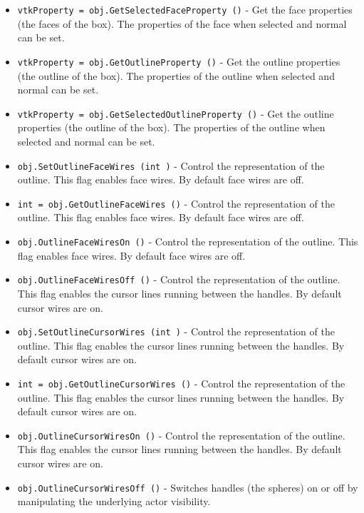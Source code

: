 \begin{itemize}
\item  \verb|vtkProperty = obj.GetSelectedFaceProperty ()| -  Get the face properties (the faces of the box). The 
 properties of the face when selected and normal can be 
 set.

\item  \verb|vtkProperty = obj.GetOutlineProperty ()| -  Get the outline properties (the outline of the box). The 
 properties of the outline when selected and normal can be 
 set.

\item  \verb|vtkProperty = obj.GetSelectedOutlineProperty ()| -  Get the outline properties (the outline of the box). The 
 properties of the outline when selected and normal can be 
 set.

\item  \verb|obj.SetOutlineFaceWires (int )| -  Control the representation of the outline. This flag enables
 face wires. By default face wires are off.

\item  \verb|int = obj.GetOutlineFaceWires ()| -  Control the representation of the outline. This flag enables
 face wires. By default face wires are off.

\item  \verb|obj.OutlineFaceWiresOn ()| -  Control the representation of the outline. This flag enables
 face wires. By default face wires are off.

\item  \verb|obj.OutlineFaceWiresOff ()| -  Control the representation of the outline. This flag enables
 the cursor lines running between the handles. By default cursor
 wires are on.

\item  \verb|obj.SetOutlineCursorWires (int )| -  Control the representation of the outline. This flag enables
 the cursor lines running between the handles. By default cursor
 wires are on.

\item  \verb|int = obj.GetOutlineCursorWires ()| -  Control the representation of the outline. This flag enables
 the cursor lines running between the handles. By default cursor
 wires are on.

\item  \verb|obj.OutlineCursorWiresOn ()| -  Control the representation of the outline. This flag enables
 the cursor lines running between the handles. By default cursor
 wires are on.

\item  \verb|obj.OutlineCursorWiresOff ()| -  Switches handles (the spheres) on or off by manipulating the underlying
 actor visibility.


\end{itemize}
